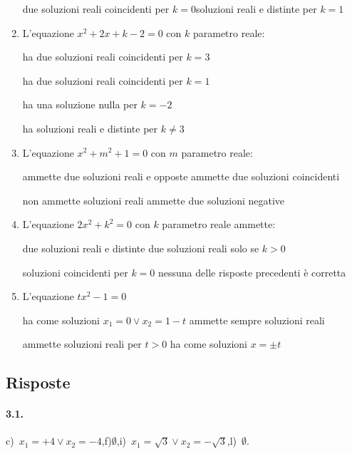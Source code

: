 \begin{esercizio}[\Ast]
\begin{enumerate}
\boxC\; due soluzioni reali coincidenti per $ k=0 $\quad\boxD\;soluzioni reali e distinte per $ k=1 $

	\item L’equazione $x^{2} + 2x + k-2 = 0$ con $ k $ parametro reale:

\boxA\quad ha due soluzioni reali coincidenti per $ k=3 $

\boxB\quad ha due soluzioni reali coincidenti per $ k=1 $

\boxC\quad ha una soluzione nulla per $k =-2$

\boxD\quad ha soluzioni reali e distinte per $k \neq 3$

	\item L’equazione $x^{2} + m^{2} + 1 = 0$ con $m$ parametro reale:

\boxA\; ammette due soluzioni reali e opposte\quad\boxB\; ammette due soluzioni coincidenti

\boxC\; non ammette soluzioni reali\quad\boxD\; ammette due soluzioni negative

	\item L’equazione $2x^{2} + k^{2} = 0$ con $k$ parametro reale ammette:

\boxA\; due soluzioni reali e distinte\quad\boxB\; due soluzioni reali solo se $k>0$

\boxC\; soluzioni coincidenti per $k = 0$\quad\boxD\; nessuna delle risposte precedenti è corretta

	\item L’equazione $tx^{2}-1 = 0$

\boxA\; ha come soluzioni $x_{1} = 0 \vee x_{2} = 1-t$\quad\boxB\; ammette sempre soluzioni reali

\boxC\; ammette soluzioni reali per $t > 0$\quad\boxD\; ha come soluzioni $x = \pm t$

\end{enumerate}
\end{esercizio}

\subsection{Risposte}
\paragraph{3.1.} c)~$x_{1}=+4 \vee x_{2}=-4$,\quad f)$\emptyset$,\quad i)~$x_{1} = \sqrt{3} \vee x _{2} = - \sqrt{3}$,\quad l)~$\emptyset$.

